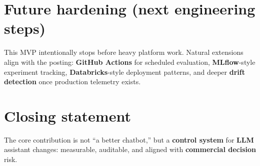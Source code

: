 \documentclass[11pt,a4paper]{article}
\newcommand{\JD}[1]{\colorbox{KwFill}{\textbf{\small #1}}}
\begin{document}
\section{Future hardening (next engineering steps)}
This MVP intentionally stops before heavy platform work. Natural extensions align with the posting: \JD{GitHub Actions} for scheduled evaluation, \JD{MLflow}-style experiment tracking, \JD{Databricks}-style deployment patterns, and deeper \JD{drift detection} once production telemetry exists.

\section{Closing statement}
The core contribution is not ``a better chatbot,'' but a \textbf{control system} for \JD{LLM} assistant changes: measurable, auditable, and aligned with \JD{commercial decision} risk.
\end{document}
